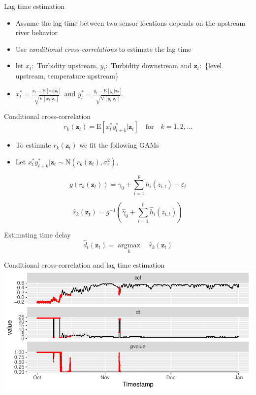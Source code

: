 \documentclass[14pt,ignorenonframetext,compress]{beamer}
\begin{document}
\begin{frame}{Lag time estimation}
\protect\hypertarget{lag-time-estimation}{}
\begin{itemize}
\item
  Assume the lag time between two sensor locations depends on the
  upstream river behavior
\item
  Use \emph{conditional cross-correlations} to estimate the lag time
\item
  let \(x_t:\) Turbidity upstream, \(y_t:\) Turbidity downstream and
  \(\bm{z}_t:\) \{level upstream, temperature upstream\}
\item
  \(x^*_t = \frac{x_t - \text{E}[x_t|\bm{z}_t]}{\sqrt{\text{V}[x_t|\bm{z}_t]}}\)
  and
  \(y^*_t = \frac{y_t - \text{E}[y_t|\bm{z}_t]}{\sqrt{\text{V}[y_t|\bm{z}_t]}}\)
\end{itemize}
\end{frame}

\begin{frame}
\begin{block}{Conditional cross-correlation}
\protect\hypertarget{conditional-cross-correlation}{}
\[
r_k(\bm{z}_t) = \text{E}[x_t^*y^*_{t+k}|\bm{z}_t] \quad \text{for} \quad k = 1,2,...
\]

\begin{itemize}
\item
  To estimate \(r_k(\bm{z}_t)\) we fit the following GAMs
\item
  Let
  \(x_t^*y^*_{t+k}|\bm{z}_t \sim \text{N}(r_k(\bm{z}_t), \sigma_r^2)\),
\end{itemize}

\[
g(r_k(\bm{z}_t)) = \gamma_0 + \sum_{i=1}^p h_i(z_{i,t}) + \varepsilon_t
\]

\[
\hat{r}_k(\bm{z}_t) = g^{-1}( \hat{\gamma}_0 + \sum_{i=1}^p \hat{h}_i(z_{i,t}))
\]
\end{block}

\begin{block}{Estimating time delay}
\protect\hypertarget{estimating-time-delay}{}
\[
\hat{d}_{t}(\bm{z}_t) = \underset{k}{\operatorname{argmax}}\quad \hat{r}_{k}(\bm{z}_t)
\]
\end{block}
\end{frame}

\begin{frame}{Conditional cross-correlation and lag time estimation}
\protect\hypertarget{conditional-cross-correlation-and-lag-time-estimation}{}
\includegraphics[width=1\linewidth]{plots/plot_ccf_dt_pval}
\end{frame}
\end{document}

